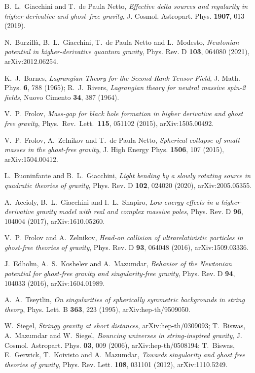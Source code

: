 \documentclass[aps,prd,a4paper,twocolumn,showpacs,showkeys,preprintnumbers,amsmath,amssymb,nofootinbib]{revtex4-2}
\numberwithin{equation}{section}
\begin{document}
\begin{thebibliography}{}
B.~L.~Giacchini and T.~de Paula Netto,
{\it Effective delta sources and regularity in higher-derivative and ghost--free gravity},
J. Cosmol. Astropart. Phys. {\bf 1907}, 013 (2019).

N.~Burzill\`a, B.~L.~Giacchini, T.~de Paula Netto and L.~Modesto,
{\it Newtonian potential in higher-derivative quantum gravity},
Phys. Rev. D \textbf{103}, 064080  (2021), arXiv:2012.06254.

K.~J.~Barnes,
{\it Lagrangian Theory for the Second-Rank Tensor Field},
J. Math. Phys. {\bf 6}, 788 (1965);
R.~J.~Rivers,
{\it Lagrangian theory for neutral massive spin-2 fields},
Nuovo Cimento {\bf 34}, 387 (1964).

V.~P.~Frolov,
{\it Mass-gap for black hole formation in higher derivative and ghost free gravity},
Phys.\ Rev.\ Lett.\  {\bf 115}, 051102 (2015), arXiv:1505.00492.

V.~P.~Frolov, A.~Zelnikov and T.~de Paula Netto,
{\it Spherical collapse of small masses in the ghost-free gravity},
J. High Energy Phys. {\bf 1506}, 107 (2015), arXiv:1504.00412.

L.~Buoninfante and B.~L.~Giacchini,
{\it Light bending by a slowly rotating source in quadratic theories of gravity},
Phys. Rev. D \textbf{102}, 024020 (2020),
arXiv:2005.05355.

A.~Accioly, B.~L.~Giacchini and I.~L.~Shapiro,
{\it Low-energy effects in a higher-derivative gravity model with real and complex massive poles},
Phys. Rev. D \textbf{96}, 104004 (2017),
arXiv:1610.05260.

V.~P.~Frolov and A.~Zelnikov,
{\it Head-on collision of ultrarelativistic particles in ghost-free theories of gravity},
Phys. Rev. D {\bf 93}, 064048 (2016), arXiv:1509.03336.

J.~Edholm, A.~S.~Koshelev and A.~Mazumdar,
{\it Behavior of the Newtonian potential for ghost-free gravity and singularity-free gravity},
Phys. Rev. D \textbf{94}, 104033 (2016),
arXiv:1604.01989.

A.~A.~Tseytlin,
{\it On singularities of spherically symmetric backgrounds in string theory},
Phys. Lett. B \textbf{363}, 223 (1995),
arXiv:hep-th/9509050.

W.~Siegel,
{\it Stringy gravity at short distances},
arXiv:hep-th/0309093;
%
T.~Biswas, A.~Mazumdar and W.~Siegel,
{\it Bouncing universes in string-inspired gravity},
J. Cosmol. Astropart. Phys. \textbf{03}, 009 (2006), arXiv:hep-th/0508194;
%
T.~Biswas, E.~Gerwick, T.~Koivisto and A.~Mazumdar,
{\it Towards singularity and ghost free theories of gravity},
Phys. Rev. Lett. \textbf{108}, 031101 (2012),
arXiv:1110.5249.


\end{thebibliography}
\end{document}
